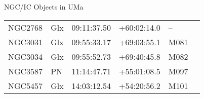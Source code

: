\begin{block}{NGC/IC Objects in UMa}
  \centering
  \begin{tabularx}{\textwidth}{llrrll} \toprule 
    NGC2768 & Glx & 09:11:37.50 & +60:02:14.0  & -- \\ 
    NGC3031 & Glx & 09:55:33.17 & +69:03:55.1  & M081 \\ 
    NGC3034 & Glx & 09:55:52.73 & +69:40:45.8  & M082 \\ 
    NGC3587 & PN & 11:14:47.71 & +55:01:08.5  & M097 \\ 
    NGC5457 & Glx & 14:03:12.54 & +54:20:56.2  & M101 \\ 
  \end{tabularx}
\end{block}